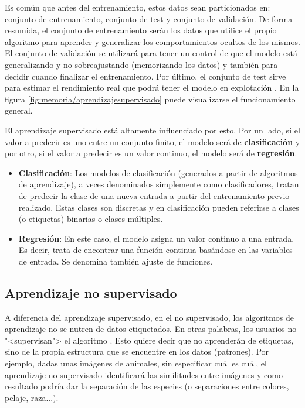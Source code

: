 Es común que antes del entrenamiento, estos datos sean particionados en:
conjunto de entrenamiento, conjunto de test y conjunto de validación. De forma
resumida, el conjunto de entrenamiento serán los datos que utilice el propio
algoritmo para aprender y generalizar los comportamientos ocultos de los mismos.
El conjunto de validación se utilizará para tener un control de que el modelo
está generalizando y no sobreajustando (memorizando los datos) y también para
decidir cuando finalizar el entrenamiento. Por último, el conjunto de test sirve
para estimar el rendimiento real que podrá tener el modelo en explotación
\cite{enwiki:conjuntos}. En la figura \ref{fig:memoria/aprendizajesupervisado}
puede visualizarse el funcionamiento general.


El aprendizaje supervisado está altamente influenciado por esto. Por un lado, si
el valor a predecir es uno entre un conjunto finito, el modelo será de
\textbf{clasificación} y por otro, si el valor a predecir es un valor continuo,
el modelo será de \textbf{regresión}.

\begin{itemize}
    \item \textbf{Clasificación}: Los modelos de clasificación (generados a
    partir de algoritmos de aprendizaje), a veces denominados simplemente como
    clasificadores, tratan de predecir la clase de una nueva entrada a partir
    del entrenamiento previo realizado. Estas clases son discretas y en
    clasificación pueden referirse a clases (o etiquetas) binarias o clases
    múltiples.
    
    \item \textbf{Regresión}: En este caso, el modelo asigna un valor continuo a
    una entrada. Es decir, trata de encontrar una función continua basándose en
    las variables de entrada. Se denomina también ajuste de funciones.
\end{itemize}

\clearpage

\subsection{Aprendizaje no supervisado}

A diferencia del aprendizaje supervisado, en el no supervisado, los algoritmos
de aprendizaje no se nutren de datos etiquetados. En otras palabras, los
usuarios no "<supervisan"> el algoritmo \cite{salim:usl}. Esto quiere decir que
no aprenderán de etiquetas, sino de la propia estructura que se encuentre en los
datos (patrones). Por ejemplo, dadas unas imágenes de animales, sin especificar
cuál es cuál, el aprendizaje no supervisado identificará las similitudes entre
imágenes y como resultado podría dar la separación de las especies (o
separaciones entre colores, pelaje, raza...).

